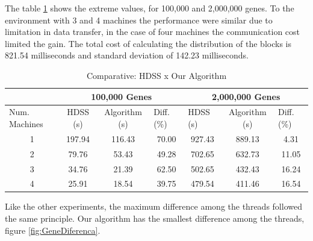 \documentclass[journal]{IEEEtran}
\begin{document}
The table \ref{table: gene} shows the extreme values​​, for 100,000 and 2,000,000 genes. 
To the environment with 3 and 4 machines the performance were similar due to limitation in data transfer, in the case of four machines the communication cost limited the gain. The total cost of calculating the distribution of the blocks is 821.54
milliseconds and standard deviation of 142.23 milliseconds.

\begin{table}[htb]
\centering
\caption{Comparative: HDSS x Our Algorithm}

\begin{tabular}{c|c|c|c|c|c|c|}
\cline{2-7}
\multicolumn{1}{l|}{}                 & \multicolumn{3}{c|}{100,000 Genes}                              & \multicolumn{3}{c|}{2,000,000 Genes}                                                  \\ \hline
\multicolumn{1}{|l|}{Num. Machines} & HDSS (s) & Algorithm (s) & \multicolumn{1}{l|}{Diff. (\%)} & \multicolumn{1}{l|}{HDSS (s)} & Algorithm (s) & \multicolumn{1}{l|}{Diff. (\%)} \\ \hline
\multicolumn{1}{|c|}{1 }       &197.94     & 116.43              & 70.00                         & 927.43                         & 889.13              &           4.31                 \\ \hline
\multicolumn{1}{|c|}{2 }      & 79.76     & 53.43              & 49.28                            & 702.65                          & 632.73              & 11.05                           \\ \hline
\multicolumn{1}{|c|}{3 }      & 34.76     & 21.39              & 62.50                            & 502.65                          & 432.43             &               16.24                  \\ \hline
\multicolumn{1}{|c|}{4 }      & 25.91     & 18.54              & 39.75                            & 479.54                          & 411.46             &               16.54  \\ \hline
\end{tabular}
\label{table: gene}
\end{table}

Like the other experiments, the maximum difference among the threads followed the same principle. Our algorithm has the smallest difference among the threads, figure \ref{fig:GeneDiferenca}.
\end{document}
